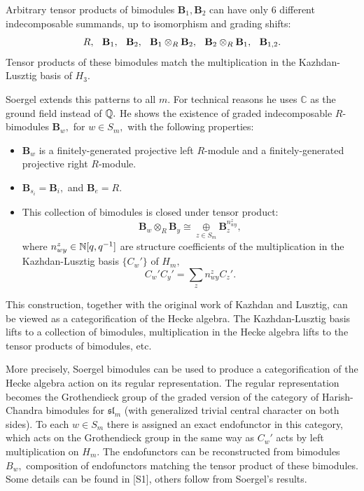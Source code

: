 \documentclass[12pt]{article}
\newcommand{\oplusop}[1]{{\mathop{\oplus}\limits_{#1}}}
\begin{document}
\vspace{0.1in} 

Arbitrary tensor products of bimodules $\mathbf{B}_1,\mathbf{B}_2$
can have only $6$ different indecomposable summands, up to isomorphism 
and grading shifts: 
$$ R, \hspace{0.1in} \mathbf{B}_1, \hspace{0.1in} \mathbf{B}_2,  
\hspace{0.1in} \mathbf{B}_1\otimes_R  \mathbf{B}_2, \hspace{0.1in}
\mathbf{B}_2\otimes_R  \mathbf{B}_1, \hspace{0.1in}
 \mathbf{B}_{1,2}.$$
Tensor products of these bimodules match the multiplication in 
the Kazhdan-Lusztig basis of $H_3.$ 

\vspace{0.1in} 

Soergel extends this patterns to all $m.$ For technical reasons he uses 
$\mathbb{C}$ as the ground field instead of $\mathbb Q.$ He shows the existence of 
graded indecomposable $R$-bimodules $\mathbf{B}_w,$ for $w\in S_m,$  
with the following properties: 
\begin{itemize} 
\item $\mathbf{B}_w$ is a finitely-generated projective left $R$-module
and a finitely-generated projective right $R$-module. 
\item $\mathbf{B}_{s_i}= \mathbf{B}_i,$ and $\mathbf{B}_{e}= R.$ 
\item This collection of bimodules is closed under tensor product:  
$$\mathbf{B}_{w}\otimes_R \mathbf{B}_y \cong \oplusop{z\in S_m} 
   \mathbf{B}_z^{n^z_{wy}},$$ 
where $n^z_{wy}\in \mathbb N[q,q^{-1}]$ are structure coefficients of 
the multiplication in the Kazhdan-Lusztig basis $\{ C_w'\}$ of $H_m,$
 $$C_w' C_y' =\sum_z n_{wy}^z C_z'.$$
\end{itemize} 

This construction, together with  the original work of Kazhdan and Lusztig, 
can be viewed as a categorification of the Hecke algebra. The 
Kazhdan-Lusztig basis lifts to a collection of bimodules, multiplication 
in the Hecke algebra lifts to the tensor products of bimodules, etc. 

More precisely, Soergel bimodules can be used to produce a categorification 
of the Hecke algebra action on its regular representation. The regular 
representation becomes the Grothendieck group of the graded version 
of the category of Harish-Chandra bimodules for $\mathfrak{sl}_m$ (with 
generalized trivial central character on both sides). To each $w\in S_m$ 
there is assigned an exact endofunctor in this category, which acts 
on the Grothendieck group in the same way as $C_w'$ acts by 
left multiplication on $H_m.$ The endofunctors can be reconstructed 
from bimodules $B_w,$ composition of endofunctors matching the 
tensor product of these bimodules. Some details can be found in [S1], others 
follow from Soergel's results.  
\end{document}
